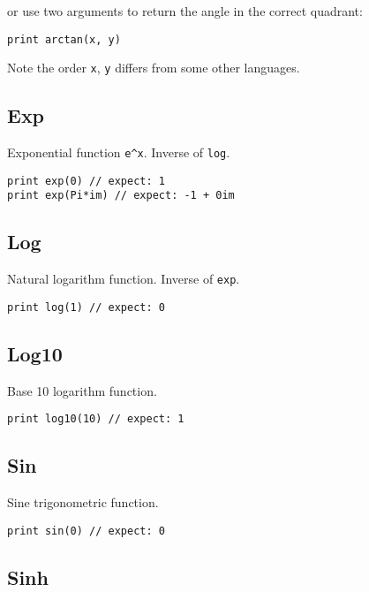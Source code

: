 or use two arguments to return the angle in the correct quadrant:

\begin{lstlisting}
print arctan(x, y)
\end{lstlisting}

Note the order \texttt{x}, \texttt{y} differs from some other languages.

\hypertarget{exp}{%
\subsection{Exp}\label{exp}}

Exponential function \texttt{e\^{}x}. Inverse of \texttt{log}.

\begin{lstlisting}
print exp(0) // expect: 1 
print exp(Pi*im) // expect: -1 + 0im
\end{lstlisting}

\hypertarget{log}{%
\subsection{Log}\label{log}}

Natural logarithm function. Inverse of \texttt{exp}.

\begin{lstlisting}
print log(1) // expect: 0 
\end{lstlisting}

\hypertarget{log10}{%
\subsection{Log10}\label{log10}}

Base 10 logarithm function.

\begin{lstlisting}
print log10(10) // expect: 1
\end{lstlisting}

\hypertarget{sin}{%
\subsection{Sin}\label{sin}}

Sine trigonometric function.

\begin{lstlisting}
print sin(0) // expect: 0 
\end{lstlisting}

\hypertarget{sinh}{%
\subsection{Sinh}\label{sinh}}

